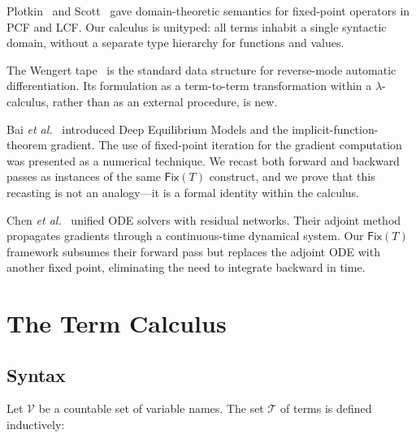 \documentclass{lmcs}
\theoremstyle{plain}
\theoremstyle{definition}
\newcommand{\fix}{\mathsf{Fix}}
\newcommand{\Tcal}{\mathcal{T}}
\newcommand{\etal}{\textit{et al.}}
\begin{document}
Plotkin~\cite{plotkin1977} and Scott~\cite{scott1976} gave domain-theoretic
semantics for fixed-point operators in PCF and LCF. Our calculus is unityped:
all terms inhabit a single syntactic domain, without a separate type
hierarchy for functions and values.

The Wengert tape~\cite{wengert1964} is the standard data structure for
reverse-mode automatic differentiation. Its formulation as a term-to-term
transformation within a $\lambda$-calculus, rather than as an external
procedure, is new.

Bai \etal~\cite{bai2019} introduced Deep Equilibrium Models and the
implicit-function-theorem gradient. The use of fixed-point iteration for the
gradient computation was presented as a numerical technique. We recast both
forward and backward passes as instances of the same $\fix(T)$ construct, and
we prove that this recasting is not an analogy---it is a formal identity
within the calculus.

Chen \etal~\cite{chen2018} unified ODE solvers with residual networks. Their
adjoint method propagates gradients through a continuous-time dynamical
system. Our $\fix(T)$ framework subsumes their forward pass but replaces the
adjoint ODE with another fixed point, eliminating the need to integrate
backward in time.

\section{The Term Calculus}\label{sec:calculus}

\subsection{Syntax}

Let $\mathcal{V}$ be a countable set of variable names. The set $\Tcal$ of
terms is defined inductively:
\end{document}

